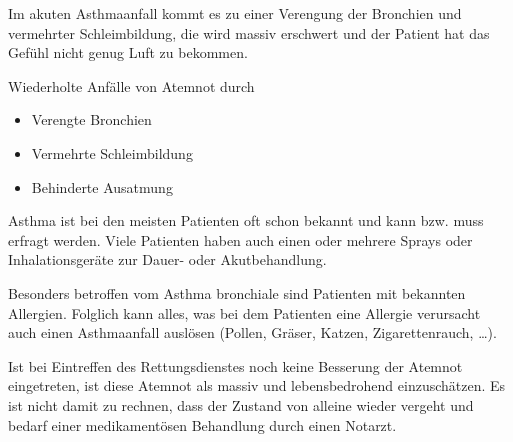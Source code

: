 

{
Im akuten Asthmaanfall kommt es zu einer Verengung der
Bronchien und vermehrter Schleimbildung, die 
wird massiv erschwert und der Patient hat das Gefühl nicht
genug Luft zu bekommen.
}{%
Wiederholte Anfälle von Atemnot durch

\begin{itemize}
  \item Verengte Bronchien
  \item Vermehrte Schleimbildung
  \item Behinderte Ausatmung
\end{itemize}
}
{}
{}
{}





Asthma ist bei den meisten Patienten oft schon bekannt und
kann bzw. muss erfragt werden. Viele Patienten haben auch
einen oder mehrere Sprays oder Inhalationsgeräte zur Dauer-
oder Akutbehandlung. 


Besonders betroffen vom Asthma bronchiale sind Patienten
mit bekannten Allergien. Folglich kann alles, was bei dem
Patienten eine Allergie verursacht auch einen Asthmaanfall
auslösen (Pollen, Gräser, Katzen, Zigarettenrauch, \ldots). 

Ist bei Eintreffen des Rettungsdienstes noch keine
Besserung der Atemnot eingetreten, ist diese Atemnot als
massiv und lebensbedrohend einzuschätzen. Es ist nicht
damit zu rechnen, dass der Zustand von alleine wieder
vergeht und bedarf einer medikamentösen Behandlung durch einen
Notarzt. 



